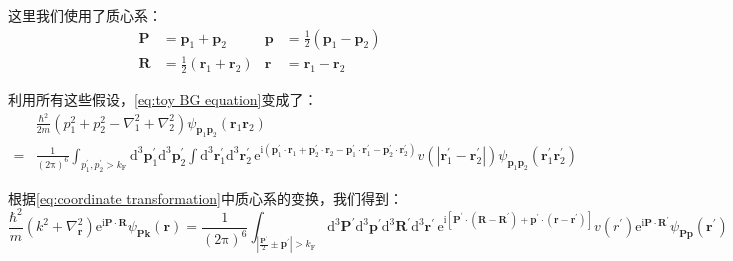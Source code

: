 这里我们使用了质心系：
\begin{align}
\boldsymbol{P} & =\boldsymbol{p}_{1}+\boldsymbol{p}_{2} & \boldsymbol{p} & =\frac{1}{2}(\boldsymbol{p}_{1}-\boldsymbol{p}_{2})\nonumber \\
\boldsymbol{R} & =\frac{1}{2}(\boldsymbol{r}_{1}+\boldsymbol{r}_{2}) & \boldsymbol{r} & =\boldsymbol{r}_{1}-\boldsymbol{r}_{2}\label{eq:coordinate transformation}
\end{align}

利用所有这些假设，\ref{eq:toy BG equation}变成了：
\begin{align*}
 & \frac{\hbar^{2}}{2m}(p^{2}_{1}+p^{2}_{2}-\nabla^{2}_{1}+\nabla^{2}_{2})\psi_{\boldsymbol{p}_{1}\boldsymbol{p}_{2}}(\boldsymbol{r}_{1}\boldsymbol{r}_{2})\\
= & \frac{1}{(2\mathrm{\pi})^{6}}\int_{p^{\prime}_{1},p^{\prime}_{2}>k_{\text{F}}}\mathrm{d}^{3}\boldsymbol{p}^{\prime}_{1}\mathrm{d}^{3}\boldsymbol{p}^{\prime}_{2}\int\mathrm{d}^{3}\boldsymbol{r}^{\prime}_{1}\mathrm{d}^{3}\boldsymbol{r}^{\prime}_{2}\,\mathrm{e}^{\mathrm{i}(\boldsymbol{p}^{\prime}_{1}\cdot\boldsymbol{r}_{1}+\boldsymbol{p}^{\prime}_{2}\cdot\boldsymbol{r}_{2}-\boldsymbol{p}^{\prime}_{1}\cdot\boldsymbol{r}^{\prime}_{1}-\boldsymbol{p}^{\prime}_{2}\cdot\boldsymbol{r}^{\prime}_{2})}v(\left|\boldsymbol{r}^{\prime}_{1}-\boldsymbol{r}^{\prime}_{2}\right|)\psi_{\boldsymbol{p}_{1}\boldsymbol{p}_{2}}(\boldsymbol{r}^{\prime}_{1}\boldsymbol{r}^{\prime}_{2})
\end{align*}

根据\ref{eq:coordinate transformation}中质心系的变换，我们得到：
\[
\frac{\hbar^{2}}{m}(k^{2}+\nabla^{2}_{\boldsymbol{r}})\mathrm{e}^{\mathrm{i}\boldsymbol{P}\cdot\boldsymbol{R}}\psi_{\boldsymbol{P}\boldsymbol{k}}(\boldsymbol{r})=\frac{1}{(2\mathrm{\pi})^{6}}\int_{\left|\frac{\boldsymbol{P}^{\prime}}{2}\pm\boldsymbol{p}^{\prime}\right|>k_{\text{F}}}\mathrm{d}^{3}\boldsymbol{P}^{\prime}\mathrm{d}^{3}\boldsymbol{p}^{\prime}\mathrm{d}^{3}\boldsymbol{R}^{\prime}\mathrm{d}^{3}\boldsymbol{r}^{\prime}\,\mathrm{e}^{\mathrm{i}[\boldsymbol{P}^{\prime}\cdot(\boldsymbol{R}-\boldsymbol{R}^{\prime})+\boldsymbol{p}^{\prime}\cdot(\boldsymbol{r}-\boldsymbol{r}^{\prime})]}v(r^{\prime})\mathrm{e}^{\mathrm{i}\boldsymbol{P}\cdot\boldsymbol{R}^{\prime}}\psi_{\boldsymbol{P}\boldsymbol{p}}(\boldsymbol{r}^{\prime})
\]

